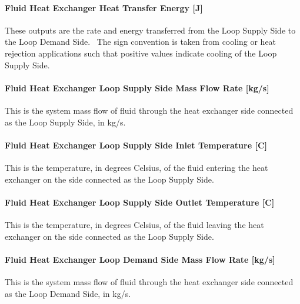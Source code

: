 \paragraph{Fluid Heat Exchanger Heat Transfer Energy {[}J{]}}\label{fluid-heat-exchanger-heat-transfer-energy-j}

These outputs are the rate and energy transferred from the Loop Supply Side to the Loop Demand Side.~ The sign convention is taken from cooling or heat rejection applications such that positive values indicate cooling of the Loop Supply Side.

\paragraph{Fluid Heat Exchanger Loop Supply Side Mass Flow Rate {[}kg/s{]}}\label{fluid-heat-exchanger-loop-supply-side-mass-flow-rate-kgs}

This is the system mass flow of fluid through the heat exchanger side connected as the Loop Supply Side, in kg/s.

\paragraph{Fluid Heat Exchanger Loop Supply Side Inlet Temperature {[}C{]}}\label{fluid-heat-exchanger-loop-supply-side-inlet-temperature-c}

This is the temperature, in degrees Celsius, of the fluid entering the heat exchanger on the side connected as the Loop Supply Side.

\paragraph{Fluid Heat Exchanger Loop Supply Side Outlet Temperature {[}C{]}}\label{fluid-heat-exchanger-loop-supply-side-outlet-temperature-c}

This is the temperature, in degrees Celsius, of the fluid leaving the heat exchanger on the side connected as the Loop Supply Side.

\paragraph{Fluid Heat Exchanger Loop Demand Side Mass Flow Rate {[}kg/s{]}}\label{fluid-heat-exchanger-loop-demand-side-mass-flow-rate-kgs}

This is the system mass flow of fluid through the heat exchanger side connected as the Loop Demand Side, in kg/s.

